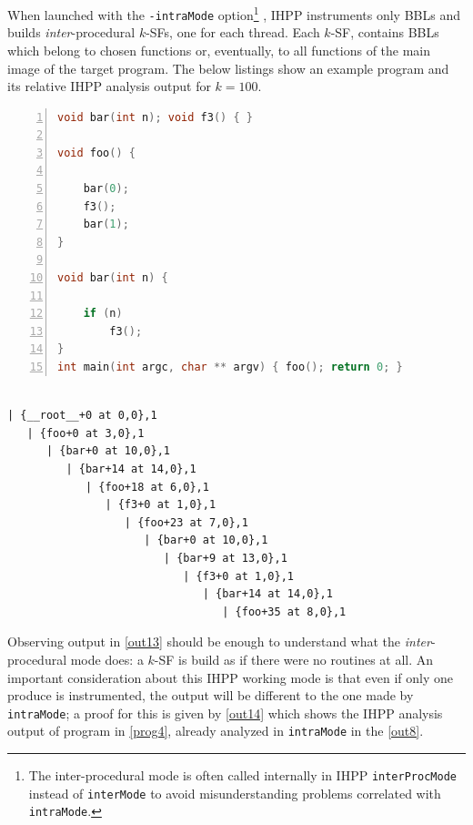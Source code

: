 \documentclass[a4paper,10pt]{report}
\begin{document}
When launched with the \verb|-intraMode| option\footnote{The inter-procedural mode is often called internally in IHPP \texttt{interProcMode} instead of \texttt{interMode} to 
avoid misunderstanding problems correlated with \texttt{intraMode}.}
, IHPP instruments only BBLs 
and builds \emph{inter}-procedural $k$-SFs, one for each thread. 
Each $k$-SF, contains BBLs which belong to chosen functions or, eventually, to all 
functions of the main image of the target program. The below listings show 
an example program and its relative IHPP analysis output for $k=100$.

\begin{lstlisting}[language=C, 
	caption={prog6.c, an example program}, label=prog6, frame=leftline, numbers=left]
void bar(int n); void f3() { }

void foo() { 

	bar(0); 
	f3(); 
	bar(1); 
}

void bar(int n) { 

	if (n) 
		f3(); 
}
int main(int argc, char ** argv) { foo(); return 0; }
\end{lstlisting}

\begin{lstlisting}[label=out13, 
caption={partial output of IHPP analysis in \texttt{interProcMode} of \texttt{prog6}}]

| {__root__+0 at 0,0},1
   | {foo+0 at 3,0},1
      | {bar+0 at 10,0},1
         | {bar+14 at 14,0},1
            | {foo+18 at 6,0},1
               | {f3+0 at 1,0},1
                  | {foo+23 at 7,0},1
                     | {bar+0 at 10,0},1
                        | {bar+9 at 13,0},1
                           | {f3+0 at 1,0},1
                              | {bar+14 at 14,0},1
                                 | {foo+35 at 8,0},1

\end{lstlisting}

Observing output in \cref{out13} should be enough to understand what the 
\emph{inter}-procedural mode does: a $k$-SF is build as if there were no routines at all.
An important consideration about this IHPP working mode is that even if
only one produce is instrumented, the output will be different to the one made by 
\verb|intraMode|; a proof for this is given by \cref{out14} which shows
the IHPP analysis output of program in \cref{prog4}, 
already analyzed in \verb|intraMode| in the \cref{out8}.
\end{document}
